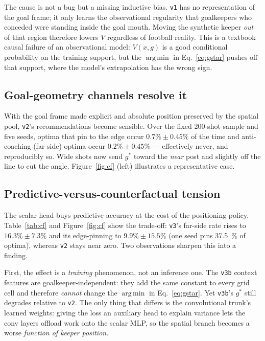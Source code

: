 \documentclass[11pt,a4paper]{article}
\newcommand{\gopt}{g^{*}}
\newcommand{\V}{V}
\newcommand{\argmin}{\operatorname*{arg\,min}}
\begin{document}
The cause is not a bug but a missing inductive bias. \texttt{v1} has no
representation of the goal frame; it only learns the observational regularity
that goalkeepers who conceded were standing inside the goal mouth. Moving the
synthetic keeper \emph{out} of that region therefore lowers $\V$ regardless of
football reality. This is a textbook causal failure of an observational model:
$\V(x,g)$ is a good conditional probability on the training support, but the
$\argmin$ in Eq.~\eqref{eq:gstar} pushes off that support, where the model's
extrapolation has the wrong sign.

\subsection{Goal-geometry channels resolve it}
\label{sec:results-v2}
With the goal frame made explicit and absolute position preserved by the spatial
pool, \texttt{v2}'s recommendations become sensible. Over the fixed \num{200}-shot
sample and five seeds, optima that pin to the edge occur $0.7\%\pm0.45\%$ of the
time and anti-coaching (far-side) optima occur $0.2\%\pm0.45\%$ --- effectively
never, and reproducibly so. Wide shots now send $\gopt$ toward the \emph{near}
post and slightly off the line to cut the angle. Figure~\ref{fig:cf} (left)
illustrates a representative case.

\subsection{Predictive-versus-counterfactual tension}
\label{sec:results-tension}
The scalar head buys predictive accuracy at the cost of the positioning policy.
Table~\ref{tab:cf} and Figure~\ref{fig:cf} show the trade-off: \texttt{v3}'s
far-side rate rises to $16.3\%\pm7.3\%$ and its edge-pinning to $9.9\%\pm15.5\%$
(one seed pins \SI{37.5}{\percent} of optima), whereas \texttt{v2} stays near
zero. Two observations sharpen this into a finding.

First, the effect is a \emph{training} phenomenon, not an inference one. The
\texttt{v3b} context features are goalkeeper-independent: they add the same
constant to every grid cell and therefore \emph{cannot} change the $\argmin$ in
Eq.~\eqref{eq:gstar}. Yet \texttt{v3b}'s $\gopt$ still degrades relative to
\texttt{v2}. The only thing that differs is the convolutional trunk's learned
weights: giving the loss an auxiliary head to explain variance lets the conv
layers offload work onto the scalar MLP, so the spatial branch becomes a worse
\emph{function of keeper position}.
\end{document}
